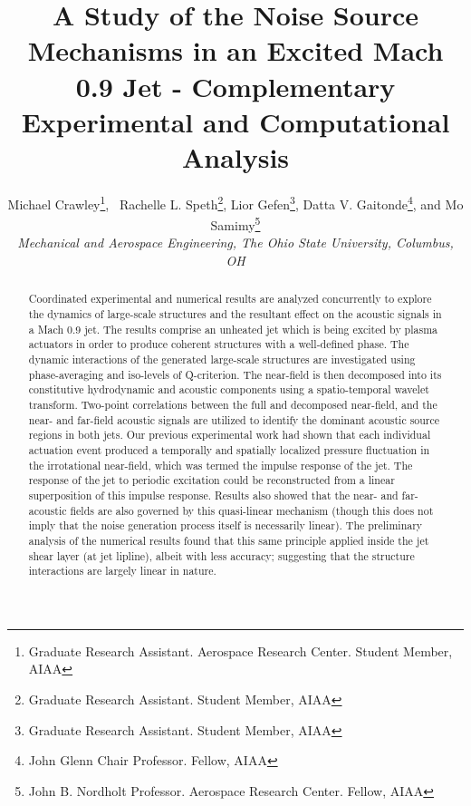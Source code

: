 \documentclass[english]{aiaa-tc}
\begin{document}
\title{A Study of the Noise Source Mechanisms in an Excited Mach 0.9 Jet - Complementary Experimental and Computational Analysis}


\author{Michael Crawley\thanks{Graduate Research Assistant. Aerospace Research Center. Student Member, AIAA}, \
Rachelle L. Speth\thanks{Graduate Research Assistant. Student Member, AIAA},
Lior Gefen\thanks{Graduate Research Assistant. Student Member, AIAA},
 Datta V. Gaitonde\thanks{John Glenn Chair Professor. Fellow, AIAA},
 and Mo Samimy\thanks{John B. Nordholt Professor. Aerospace Research Center. Fellow, AIAA}
\\\normalsize\itshape Mechanical and Aerospace Engineering, The Ohio State University, Columbus, OH \\}


\maketitle

\begin{abstract}
Coordinated experimental and numerical results are analyzed concurrently to explore the dynamics of large-scale structures and the resultant effect on the acoustic signals in a Mach 0.9 jet. 
The results comprise an unheated jet which is being excited by plasma actuators in order to produce coherent structures with a well-defined phase. 
The dynamic interactions of the generated large-scale structures are investigated using phase-averaging and iso-levels of Q-criterion. 
The near-field is then decomposed into its constitutive hydrodynamic and acoustic components using a spatio-temporal wavelet transform. 
Two-point correlations between the full and decomposed near-field, and the near- and far-field acoustic signals are utilized to identify the dominant acoustic source regions in both jets.
Our previous experimental work had shown that each individual actuation event produced a temporally and spatially localized pressure fluctuation in the irrotational near-field, which was termed the impulse response of the jet. The response of the jet to periodic excitation could be reconstructed from a linear superposition of this impulse response. 
Results also showed that the near- and far-acoustic fields are also governed by this quasi-linear mechanism (though this does not imply that the noise generation process itself is necessarily linear). 
The preliminary analysis of the numerical results found that this same principle applied inside the jet shear layer (at jet lipline), albeit with less accuracy; suggesting that the structure interactions are largely linear in nature. 

\end{abstract}
\end{document}
